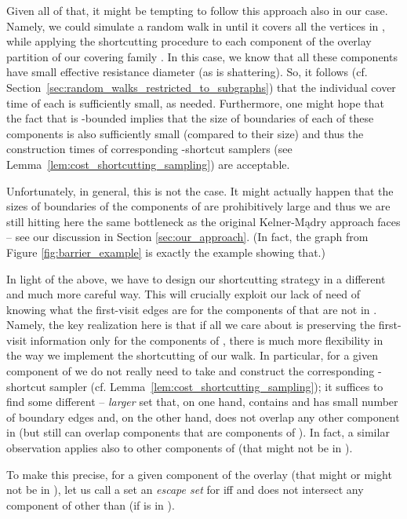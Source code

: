 \documentclass[11pt, letterpaper]{article}
\begin{document}
Given all of that, it might be tempting to follow this approach also in our case. Namely, we could simulate a random walk in  until it covers all the vertices in , while applying the shortcutting procedure to each component of the overlay partition  of our covering family . In this case, we know that all these components have small effective resistance diameter (as  is shattering). So, it follows (cf. Section~\ref{sec:random_walks_restricted_to_subgraphs}) that the individual cover time of each is sufficiently small, as needed. Furthermore, one might hope that the fact that  is -bounded implies that the size of boundaries of each of these components is also sufficiently small (compared to their size) and thus the construction times of corresponding -shortcut samplers (see Lemma~\ref{lem:cost_shortcutting_sampling}) are acceptable. 

Unfortunately, in general, this is not the case. It might actually happen that the sizes of boundaries of the components of  are prohibitively large and thus we are still hitting here the same bottleneck as the original Kelner-Mądry approach faces -- see our discussion in Section \ref{sec:our_approach}. (In fact, the graph from Figure \ref{fig:barrier_example} is exactly the example showing that.)

In light of the above, we have to design our shortcutting strategy in a different and much more careful way. This will crucially exploit our lack of need of knowing what the first-visit edges are for the components of  that are not in . Namely, the key realization here is that if all we care about is preserving the first-visit information only for the components of , there is much more flexibility in the way we implement the shortcutting of our walk. In particular, for a given component  of  we do not really need to take  and construct the corresponding -shortcut sampler (cf. Lemma~\ref{lem:cost_shortcutting_sampling}); it suffices to find some different -- {\em larger} set  that, on one hand, contains  and has small number of boundary edges and, on the other hand, does not overlap any other component in  (but still can overlap components that are components of ). In fact, a similar observation applies also to other components of  (that might not be in ).

To make this precise, for a given component  of the overlay  (that might or might not be in ), let us call a set  an {\em escape set} for  iff  and  does not intersect any component of  other than  (if  is in ).
\end{document}
